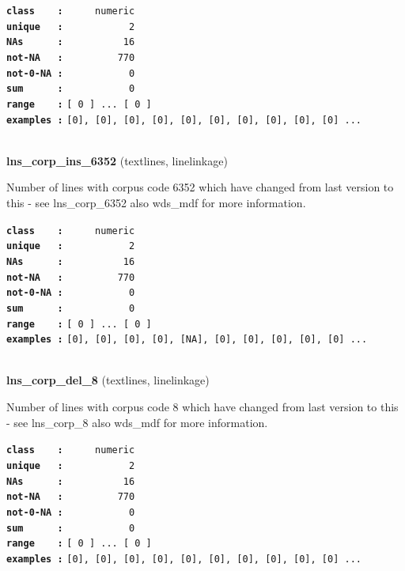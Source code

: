 \documentclass[]{article}
\begin{document}
\textbf{\texttt{class\ \ \ \ :}} \texttt{~~~~~numeric}\\
\textbf{\texttt{unique\ \ \ :}} \texttt{~~~~~~~~~~~2}\\
\textbf{\texttt{NAs\ \ \ \ \ \ :}} \texttt{~~~~~~~~~~16}\\
\textbf{\texttt{not-NA\ \ \ :}} \texttt{~~~~~~~~~770}\\
\textbf{\texttt{not-0-NA\ :}} \texttt{~~~~~~~~~~~0}\\
\textbf{\texttt{sum\ \ \ \ \ \ :}} \texttt{~~~~~~~~~~~0}\\
\textbf{\texttt{range\ \ \ \ :}}
\texttt{{[}\ 0\ {]}\ ...\ {[}\ 0\ {]}}\\
\textbf{\texttt{examples\ :}}
\texttt{{[}0{]},\ {[}0{]},\ {[}0{]},\ {[}0{]},\ {[}0{]},\ {[}0{]},\ {[}0{]},\ {[}0{]},\ {[}0{]},\ {[}0{]}\ ...}\\

~

\textbf{lns\_corp\_ins\_6352} (textlines, linelinkage)

Number of lines with corpus code 6352 which have changed from last
version to this - see lns\_corp\_6352 also wds\_mdf for more
information.

\textbf{\texttt{class\ \ \ \ :}} \texttt{~~~~~numeric}\\
\textbf{\texttt{unique\ \ \ :}} \texttt{~~~~~~~~~~~2}\\
\textbf{\texttt{NAs\ \ \ \ \ \ :}} \texttt{~~~~~~~~~~16}\\
\textbf{\texttt{not-NA\ \ \ :}} \texttt{~~~~~~~~~770}\\
\textbf{\texttt{not-0-NA\ :}} \texttt{~~~~~~~~~~~0}\\
\textbf{\texttt{sum\ \ \ \ \ \ :}} \texttt{~~~~~~~~~~~0}\\
\textbf{\texttt{range\ \ \ \ :}}
\texttt{{[}\ 0\ {]}\ ...\ {[}\ 0\ {]}}\\
\textbf{\texttt{examples\ :}}
\texttt{{[}0{]},\ {[}0{]},\ {[}0{]},\ {[}0{]},\ {[}NA{]},\ {[}0{]},\ {[}0{]},\ {[}0{]},\ {[}0{]},\ {[}0{]}\ ...}\\

~

\textbf{lns\_corp\_del\_8} (textlines, linelinkage)

Number of lines with corpus code 8 which have changed from last version
to this - see lns\_corp\_8 also wds\_mdf for more information.

\textbf{\texttt{class\ \ \ \ :}} \texttt{~~~~~numeric}\\
\textbf{\texttt{unique\ \ \ :}} \texttt{~~~~~~~~~~~2}\\
\textbf{\texttt{NAs\ \ \ \ \ \ :}} \texttt{~~~~~~~~~~16}\\
\textbf{\texttt{not-NA\ \ \ :}} \texttt{~~~~~~~~~770}\\
\textbf{\texttt{not-0-NA\ :}} \texttt{~~~~~~~~~~~0}\\
\textbf{\texttt{sum\ \ \ \ \ \ :}} \texttt{~~~~~~~~~~~0}\\
\textbf{\texttt{range\ \ \ \ :}}
\texttt{{[}\ 0\ {]}\ ...\ {[}\ 0\ {]}}\\
\textbf{\texttt{examples\ :}}
\texttt{{[}0{]},\ {[}0{]},\ {[}0{]},\ {[}0{]},\ {[}0{]},\ {[}0{]},\ {[}0{]},\ {[}0{]},\ {[}0{]},\ {[}0{]}\ ...}\\
\end{document}

